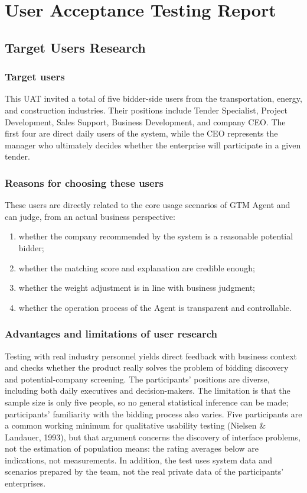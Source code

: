 \chapter{User Acceptance Testing Report}

\section{Target Users Research}

\subsection{Target users}
This UAT invited a total of five bidder-side users from the transportation, energy,
and construction industries. Their positions include Tender Specialist, Project
Development, Sales Support, Business Development, and company CEO. The first four are
direct daily users of the system, while the CEO represents the manager who ultimately
decides whether the enterprise will participate in a given tender.

\subsection{Reasons for choosing these users}
These users are directly related to the core usage scenarios of GTM Agent and can
judge, from an actual business perspective:

\begin{enumerate}
\tightlist
\item whether the company recommended by the system is a reasonable potential bidder;
\item whether the matching score and explanation are credible enough;
\item whether the weight adjustment is in line with business judgment;
\item whether the operation process of the Agent is transparent and controllable.
\end{enumerate}

\subsection{Advantages and limitations of user research}
Testing with real industry personnel yields direct feedback with business context and
checks whether the product really solves the problem of bidding discovery and
potential-company screening. The participants' positions are diverse, including both
daily executives and decision-makers. The limitation is that the sample size is only
five people, so no general statistical inference can be made; participants' familiarity
with the bidding process also varies. Five participants are a common working minimum
for qualitative usability testing (Nielsen \& Landauer, 1993), but that argument
concerns the discovery of interface problems, not the estimation of population means:
the rating averages below are indications, not measurements. In addition, the test
uses system data and
scenarios prepared by the team, not the real private data of the participants'
enterprises.

